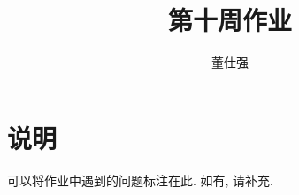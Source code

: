 \documentclass[11pt]{ctexart}
\title{第十周作业}
\author{董仕强}
\theoremstyle{definition}
\numberwithin{equation}{section}
\theoremstyle{definition}
\theoremstyle{remark}
\begin{document}
\maketitle

\section{说明}

可以将作业中遇到的问题标注在此. 如有, 请补充.

\tableofcontents

\newpage

\end{document}
